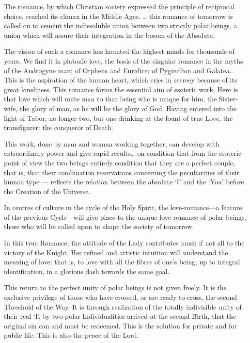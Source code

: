 \begin{quotationx}
The romance, by which Christian society expressed the principle of reciprocal choice, reached its climax in the Middle Ages. … this romance of tomorrow is called on to cement the indissoluble union between two strictly polar beings, a union which will assure their integration in the bosom of the Absolute.

The vision of such a romance has haunted the highest minds for thousands of years. We find it in platonic love, the basis of the singular romance in the myths of the Androgyne man; of Orpheus and Euridice; of Pygmalion and Galatea… This is the aspiration of the human heart, which cries in secrecy because of its great loneliness. This romance forms the essential aim of esoteric work. Here is that love which will unite man to that being who is unique for him, the Sister-wife, the glory of man, as he will be the glory of God. Having entered into the light of Tabor, no longer two, but one drinking at the fount of true Love, the transfigurer: the conqueror of Death.

This work, done by man and woman working together, can develop with extraordinary power and give rapid results… on condition that from the esoteric point of view the two beings entirely condition that they are a perfect couple, that is, that their combination reservations concerning the peculiarities of their human type — reflects the relation between the absolute `I' and the `You' before the Creation of the Universe.

In centres of culture in the cycle of the Holy Spirit, the love-romance—a feature of the previous Cycle—will give place to the unique love-romance of polar beings, those who will be called upon to shape the society of tomorrow.

In this true Romance, the attitude of the Lady contributes much if not all to the victory of the Knight. Her refined and artistic intuition will understand the meaning of love: that is, to love with all the fibres of one's being, up to integral identification, in a glorious dash towards the same goal.

This return to the perfect unity of polar beings is not given freely. It is the exclusive privilege of those who have crossed, or are ready to cross, the second Threshold of the Way. It is through realization of the totally indivisible unity of their real `I'. by two polar Individualities arrived at the second Birth, that the original sin can and must be redeemed. This is the solution for private and for public life. This is also the peace of the Lord.


\end{quotationx}
